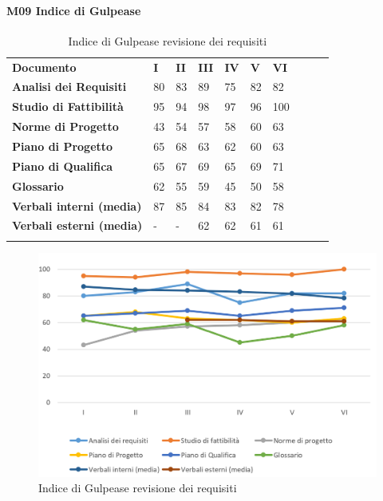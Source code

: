 \paragraph{M09 Indice di Gulpease}\mbox{} %
\begin{longtable} {						
		>{}p{50mm}  		
		>{}p{8mm}		
		>{}p{8mm}		
		>{}p{8mm}		
		>{}p{8mm}		
		>{}p{8mm}		
		>{}p{8mm}
		>{}p{8mm}
		>{}p{8mm}
		>{}p{8mm}				
	}			
	\rowcolor{gray!50}
	\textbf{Documento} & \textbf{I} & \textbf{II} & \textbf{III} & \textbf{IV} & \textbf{V} & \textbf{VI} \TBstrut \\ [2mm]
	\textbf{Analisi dei Requisiti} & 80 & 83 & 89 & 75 & 82 & 82 \TBstrut \\ [2mm]
	\textbf{Studio di Fattibilità} & 95 & 94 & 98 & 97 & 96 & 100 \TBstrut \\ [2mm]
	\textbf{Norme di Progetto} & 43 & 54 & 57 & 58 & 60 & 63 \TBstrut \\ [2mm]
	\textbf{Piano di Progetto} & 65 & 68 & 63 & 62 & 60 & 63 \TBstrut \\ [2mm]
	\textbf{Piano di Qualifica} & 65 & 67 & 69 & 65 & 69 & 71 \TBstrut \\ [2mm]
	\textbf{Glossario} & 62 & 55 & 59 & 45 & 50 & 58 \TBstrut \\ [2mm]
	\textbf{Verbali interni (media)} & 87 & 85 & 84 & 83 & 82 & 78 \TBstrut \\ [2mm]
	\textbf{Verbali esterni (media)} & - & - & 62 & 62 & 61 & 61 \TBstrut \\ [2mm]
	\rowcolor{white}
	\caption{Indice di Gulpease revisione dei requisiti}
\end{longtable}
\begin{figure}[H] 	
	\includegraphics[width=\linewidth]{./img/grafici/2.png}	
	\caption{Indice di Gulpease revisione dei requisiti}	
\end{figure}
